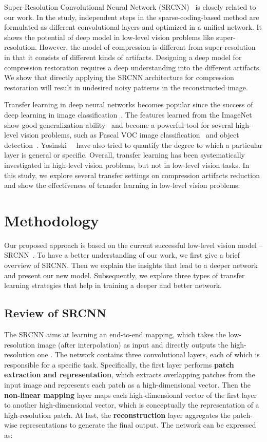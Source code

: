 \documentclass[10pt,twocolumn,letterpaper]{article}
\begin{document}
Super-Resolution Convolutional Neural Network (SRCNN)~\cite{Dong2014} is closely related to our work. In the study, independent steps in the sparse-coding-based method are formulated as different convolutional layers and optimized in a unified network. It shows the potential of deep model in low-level vision problems like super-resolution. However, the model of compression is different from super-resolution in that it consists of different kinds of artifacts. Designing a deep model for compression restoration requires a deep understanding into the different artifacts. We show that directly applying the SRCNN architecture for compression restoration will result in undesired noisy patterns in the reconstructed image. 

Transfer learning in deep neural networks becomes popular since the success of deep learning in image classification~\cite{Krizhevsky2012}. The features learned from the ImageNet show good generalization ability~\cite{Zeiler2014} and become a powerful tool for several high-level vision problems, such as Pascal VOC image classification~\cite{Oquab2014} and object detection~\cite{Girshick2014,Sermanet2013}.
Yosinski~\etal~\cite{Yosinski2014} have also tried to quantify the degree to which a particular layer is general or specific. Overall, transfer learning has been systematically investigated in high-level vision problems, but not in low-level vision tasks. In this study, we explore several transfer settings on compression artifacts reduction and show the effectiveness of transfer learning in low-level vision problems.


\section{Methodology}
\label{sec:Methodology}

Our proposed approach is based on the current successful low-level vision model -- SRCNN~\cite{Dong2014}. To have a better understanding of our work, we first give a brief overview of SRCNN. Then we explain the insights that lead to a deeper network and present our new model. Subsequently, we explore three types of transfer learning strategies that help in training a deeper and better network.

\subsection{Review of SRCNN}
\label{sec:SRCNN}
The SRCNN aims at learning an end-to-end mapping, which takes the low-resolution image  (after interpolation) as input and directly outputs the high-resolution one . The network contains three convolutional layers, each of which is responsible for a specific task. Specifically, the first layer performs \textbf{patch extraction and representation}, which extracts overlapping patches from the input image and represents each patch as a high-dimensional vector. Then the \textbf{non-linear mapping} layer maps each high-dimensional vector of the first layer to another high-dimensional vector, which is conceptually the representation of a high-resolution patch. At last, the \textbf{reconstruction} layer aggregates the patch-wise representations to generate the final output.
The network can be expressed as:
\end{document}
